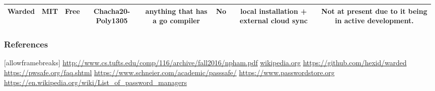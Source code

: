 \documentclass{beamer}
\begin{document}
\begin{frame}
\begin{table}[]
\begin{tabular}{@{}cccccccc@{}}
      Warded             & MIT                  & Free                         & Chacha20-Poly1305                                                  & anything that has a go compiler          & No                           & local installation + external cloud sync        & Not at present due to it being in active development. \\ \bottomrule
    \end{tabular}
  \end{table}
\end{frame}

\begin{frame}
  \frametitle{References}[allowframebreaks]
  \url{http://www.cs.tufts.edu/comp/116/archive/fall2016/npham.pdf}
  \url{wikipedia.org}
  \url{https://github.com/hexid/warded}
  \url{https://pwsafe.org/faq.shtml}
  \url{https://www.schneier.com/academic/passsafe/}
  \url{https://www.passwordstore.org}
  \url{https://en.wikipedia.org/wiki/List_of_password_managers}
\end{frame}
\end{document}
